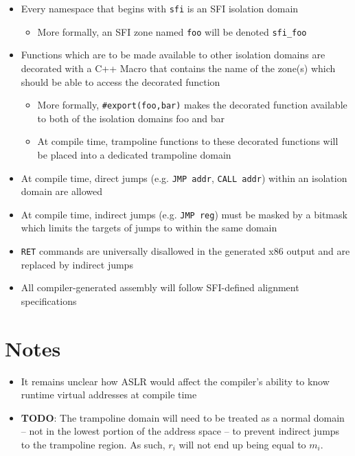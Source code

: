 \documentclass[12pt]{article}
\begin{document}
\begin{itemize}
	\item Every namespace that begins with \texttt{sfi} is an SFI isolation domain
	\begin{itemize}
		\item More formally, an SFI zone named \texttt{foo} will be denoted \texttt{sfi\_foo}
	\end{itemize}
	\item Functions which are to be made available to other isolation domains are decorated with a C++ Macro that contains the name of the zone(s) which should be able to access the decorated function
	\begin{itemize}
		\item More formally, \texttt{\#export(foo,bar)} makes the decorated function available to both of the isolation domains foo and bar
		\item At compile time, trampoline functions to these decorated functions will be placed into a dedicated trampoline domain
	\end{itemize}
	\item At compile time, direct jumps (e.g. \texttt{JMP addr}, \texttt{CALL addr}) within an isolation domain are allowed
	\item At compile time, indirect jumps (e.g. \texttt{JMP reg}) must be masked by a bitmask which limits the targets of jumps to within the same domain
	\item \texttt{RET} commands are universally disallowed in the generated x86 output and are replaced by indirect jumps
	\item All compiler-generated assembly will follow SFI-defined alignment specifications

\end{itemize}

\section{Notes}

\begin{itemize}	
	\item It remains unclear how ASLR would affect the compiler’s ability to know runtime virtual addresses at compile time

	\item  \textbf{TODO}: The trampoline domain will need to be treated as a normal domain -- not in the lowest portion of the address space -- to prevent indirect jumps to the trampoline region. As such, $r_i$ will not end up being equal to $m_i$.
\end{itemize}

\medskip
 
\printbibliography
 
\end{document}
